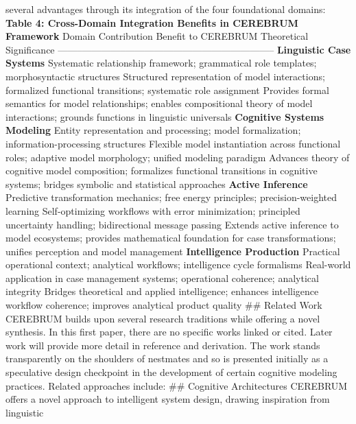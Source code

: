 \documentclass[
  11pt,
  letterpaper,
]{article}
\begin{document}
several advantages through its integration of the four foundational
domains: \textbf{Table 4: Cross-Domain Integration Benefits in CEREBRUM
Framework} \textbar{} Domain \textbar{} Contribution \textbar{} Benefit
to CEREBRUM \textbar{} Theoretical Significance \textbar{}
\textbar--------\textbar--------------\textbar---------------------\textbar--------------------------\textbar{}
\textbar{} \textbf{Linguistic Case Systems} \textbar{} Systematic
relationship framework; grammatical role templates; morphosyntactic
structures \textbar{} Structured representation of model interactions;
formalized functional transitions; systematic role assignment \textbar{}
Provides formal semantics for model relationships; enables compositional
theory of model interactions; grounds functions in linguistic universals
\textbar{} \textbar{} \textbf{Cognitive Systems Modeling} \textbar{}
Entity representation and processing; model formalization;
information-processing structures \textbar{} Flexible model
instantiation across functional roles; adaptive model morphology;
unified modeling paradigm \textbar{} Advances theory of cognitive model
composition; formalizes functional transitions in cognitive systems;
bridges symbolic and statistical approaches \textbar{} \textbar{}
\textbf{Active Inference} \textbar{} Predictive transformation
mechanics; free energy principles; precision-weighted learning
\textbar{} Self-optimizing workflows with error minimization; principled
uncertainty handling; bidirectional message passing \textbar{} Extends
active inference to model ecosystems; provides mathematical foundation
for case transformations; unifies perception and model management
\textbar{} \textbar{} \textbf{Intelligence Production} \textbar{}
Practical operational context; analytical workflows; intelligence cycle
formalisms \textbar{} Real-world application in case management systems;
operational coherence; analytical integrity \textbar{} Bridges
theoretical and applied intelligence; enhances intelligence workflow
coherence; improves analytical product quality \textbar{} \#\# Related
Work CEREBRUM builds upon several research traditions while offering a
novel synthesis. In this first paper, there are no specific works linked
or cited. Later work will provide more detail in reference and
derivation. The work stands transparently on the shoulders of nestmates
and so is presented initially as a speculative design checkpoint in the
development of certain cognitive modeling practices. Related approaches
include: \#\# Cognitive Architectures CEREBRUM offers a novel approach
to intelligent system design, drawing inspiration from linguistic
\end{document}
